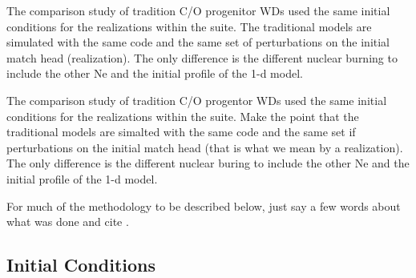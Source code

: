 \documentclass[iop,apj]{emulateapj}
\begin{document}
The comparison study of tradition C/O progenitor WDs used the same initial
conditions for the realizations within the suite. The traditional models
are simulated with the same code and the same set of perturbations on the
initial match head (realization). The only difference is the different
nuclear burning to include the other Ne and the initial profile of the
1-d model. 

The comparison study of tradition C/O progentor WDs used the same
initial conditions for the realizations within the suite. Make the
point that the traditional models are simalted with the same code
and the same set if perturbations on the initial match head (that is
what we mean by a realization). The only difference is the different
nuclear buring to include the other Ne and the initial profile of
the 1-d model.  

For much of the methodology to be described below, just say a few
words about what was done and cite \citet{willcoxetal2016}.

\subsection{Initial Conditions}
\end{document}
